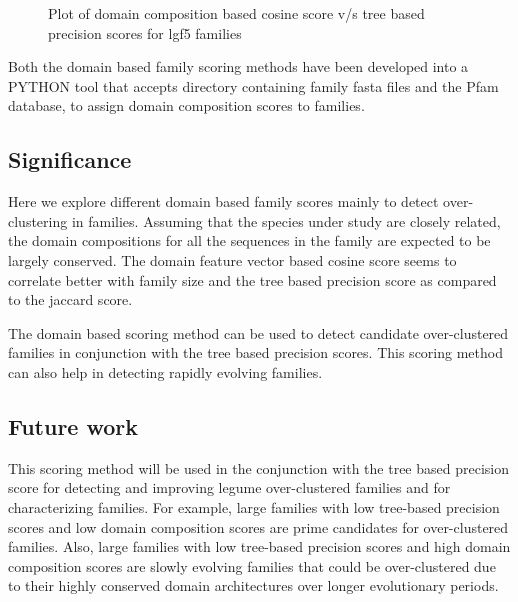 \documentclass{article}
\begin{document}
		\begin{figure}
			\caption{Plot of domain composition based cosine score v/s tree based precision scores for lgf5 families}
			\label{fig:scatter_domain_cosine_vs_tree_precision_lgf5}
		\end{figure}
		
		Both the domain based family scoring methods have been developed into a PYTHON tool that accepts directory containing family fasta files and the Pfam database, to assign domain composition scores to families.
	
	\subsection{Significance}
	Here we explore different domain based family scores mainly to detect over-clustering in families. Assuming that the species under study are closely related, the domain compositions for all the sequences in the family are expected to be largely conserved. The domain feature vector based cosine score seems to correlate better with family size and the tree based precision score as compared to the jaccard score.
	
	The domain based scoring method can be used to detect candidate over-clustered families in conjunction with the tree based precision scores. This scoring method can also help in detecting rapidly evolving families.
	
	\subsection{Future work}
	This scoring method will be used in the conjunction with the tree based precision score for detecting and improving  legume over-clustered families and for characterizing families. For example,  large families with low tree-based precision scores and low domain composition scores are prime candidates for over-clustered families. Also, large families with low tree-based precision scores and high domain composition scores are slowly evolving families that could be over-clustered due to their highly conserved domain architectures over longer evolutionary periods.
	
\end{document}
